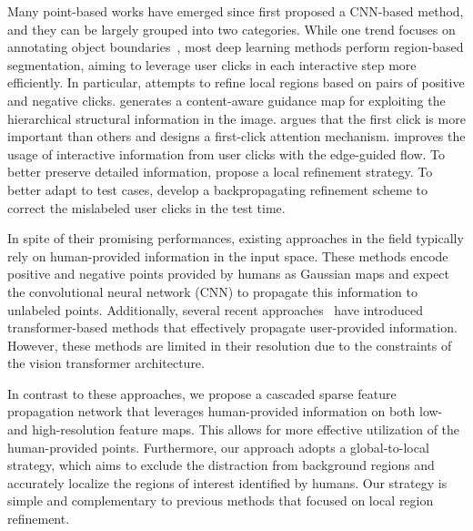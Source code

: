 \documentclass{bmvc2k}
\begin{document}
Many point-based works have emerged since \cite{xu2016deep} first proposed a CNN-based method, and they can be largely grouped into two categories. While one trend focuses on annotating object boundaries~\cite{castrejon2017annotating,le2018interactive,acuna2018efficient,ling2019fast}, most deep learning methods perform region-based segmentation, aiming to leverage user clicks in each interactive step more efficiently. In particular, \cite{liew2017regional} attempts to refine local regions based on pairs of positive and negative clicks.  \cite{majumder2019content} generates a content-aware guidance map for exploiting the hierarchical structural information in the image. \cite{lin2020interactive} argues that the first click is more important than others and designs a first-click attention mechanism. \cite{Hao_2021_ICCV} improves the usage of interactive information from user clicks with the edge-guided flow. To better preserve detailed information, \cite{Chen_2022_CVPR,Lin_2022_CVPR} propose a local refinement strategy. To better adapt to test cases, \cite{jang2019interactive,sofiiuk2020f} develop a backpropagating refinement scheme to correct the mislabeled user clicks in the test time. 

In spite of their promising performances, existing approaches in the field typically rely on human-provided information in the input space. These methods encode positive and negative points provided by humans as Gaussian maps and expect the convolutional neural network (CNN) to propagate this information to unlabeled points. Additionally, several recent approaches~\cite{kirillov2023segment,liu2022simpleclick} have introduced transformer-based methods that effectively propagate user-provided information. However, these methods are limited in their resolution due to the constraints of the vision transformer architecture.

In contrast to these approaches, we propose a cascaded sparse feature propagation network that leverages human-provided information on both low- and high-resolution feature maps. This allows for more effective utilization of the human-provided points. Furthermore, our approach adopts a global-to-local strategy, which aims to exclude the distraction from background regions and accurately localize the regions of interest identified by humans. Our strategy is simple and complementary to previous methods that focused on local region refinement.
\end{document}
